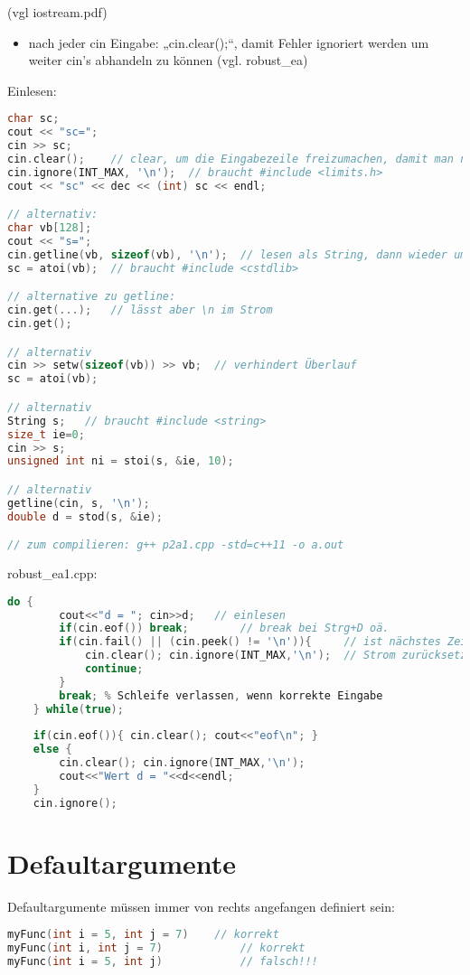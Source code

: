 (vgl iostream.pdf)
\begin{itemize}
\item nach jeder cin Eingabe: „cin.clear();“, damit Fehler ignoriert werden um weiter cin's abhandeln zu können (vgl. robust\_ea)
\end{itemize}
Einlesen:
\begin{lstlisting}[language=C++]
char sc;
cout << "sc=";
cin >> sc;
cin.clear();	// clear, um die Eingabezeile freizumachen, damit man nicht an Falscher Eingabe hängen bleibt
cin.ignore(INT_MAX, '\n');	// braucht #include <limits.h>
cout << "sc" << dec << (int) sc << endl;

// alternativ:
char vb[128];
cout << "s=";
cin.getline(vb, sizeof(vb), '\n');	// lesen als String, dann wieder umwandeln (liest auch Leerzeichen ein)
sc = atoi(vb);	// braucht #include <cstdlib>

// alternative zu getline:
cin.get(...);	// lässt aber \n im Strom
cin.get();

// alternativ
cin >> setw(sizeof(vb)) >> vb;	// verhindert Überlauf
sc = atoi(vb);

// alternativ
String s;	// braucht #include <string>
size_t ie=0;
cin >> s;
unsigned int ni = stoi(s, &ie, 10);

// alternativ
getline(cin, s, '\n');
double d = stod(s, &ie);

// zum compilieren: g++ p2a1.cpp -std=c++11 -o a.out
\end{lstlisting}

robust\_ea1.cpp:
\begin{lstlisting}[language=C++]
	do {
		cout<<"d = "; cin>>d; 	// einlesen
		if(cin.eof()) break;		// break bei Strg+D oä.
		if(cin.fail() || (cin.peek() != '\n')){		// ist nächstes Zeichen ungültig?
			cin.clear(); cin.ignore(INT_MAX,'\n');	// Strom zurücksetzen und zum \n gehen
			continue;
		}
		break; % Schleife verlassen, wenn korrekte Eingabe
	} while(true);
	
	if(cin.eof()){ cin.clear(); cout<<"eof\n"; }
	else {
		cin.clear(); cin.ignore(INT_MAX,'\n');
		cout<<"Wert d = "<<d<<endl;
	}
	cin.ignore();
\end{lstlisting}

\section{Defaultargumente}
Defaultargumente müssen immer von rechts angefangen definiert sein:
\begin{lstlisting}[language=C++]
myFunc(int i = 5, int j = 7)	// korrekt
myFunc(int i, int j = 7)			// korrekt
myFunc(int i = 5, int j)			// falsch!!!
\end{lstlisting}

